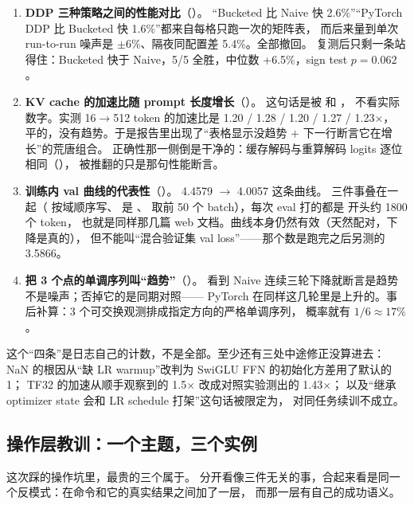 \begin{enumerate}[label=\arabic*.,leftmargin=2em]
\item \textbf{DDP 三种策略之间的性能对比}（）。
      “Bucketed 比 Naive 快 2.6\%”“PyTorch DDP 比 Bucketed 快 1.6\%”都来自每格只跑一次的矩阵表，
      而后来量到单次 run-to-run 噪声是 $\pm$6\%、隔夜同配置差 5.4\%。全部撤回。
      复测后只剩一条站得住：Bucketed 快于 Naive，5/5 全胜，中位数 +6.5\%，sign test $p=0.062$。
\item \textbf{KV cache 的加速比随 prompt 长度增长}（）。
      这句话是被  和  ，
      不看实际数字。实测 16$\to$512 token 的加速比是 1.20 / 1.28 / 1.20 / 1.27 / 1.23$\times$，
      平的，没有趋势。于是报告里出现了“表格显示没趋势 $+$ 下一行断言它在增长”的荒唐组合。
      正确性那一侧倒是干净的：缓存解码与重算解码 logits 逐位相同（），
      被推翻的只是那句性能断言。
\item \textbf{训练内 val 曲线的代表性}（）。
      4.4579 $\to$ 4.0057 这条曲线。
      三件事叠在一起（ 按域顺序写、 是 、
       取前 50 个 batch），每次 eval 打的都是  开头约 1800 个 token，
      也就是同样那几篇 web 文档。曲线本身仍然有效（天然配对，下降是真的），
      但不能叫“混合验证集 val loss”——那个数是跑完之后另测的 3.5866。
\item \textbf{把 3 个点的单调序列叫“趋势”}（）。
      看到 Naive 连续三轮下降就断言是趋势不是噪声；否掉它的是同期对照——
      PyTorch 在同样这几轮里是上升的。事后补算：3 个可交换观测排成指定方向的严格单调序列，
      概率就有 $1/6 \approx 17\%$。
\end{enumerate}

这个“四条”是日志自己的计数，不是全部。至少还有三处中途修正没算进去：
NaN 的根因从“缺 LR warmup”改判为 SwiGLU FFN 的初始化方差用了默认的 1；
TF32 的加速从顺手观察到的 1.5$\times$ 改成对照实验测出的 1.43$\times$；
以及“继承 optimizer state 会和 LR schedule 打架”这句话被限定为，
对同任务续训不成立。

\subsection*{操作层教训：一个主题，三个实例}

这次踩的操作坑里，最贵的三个属于。
分开看像三件无关的事，合起来看是同一个反模式：在命令和它的真实结果之间加了一层，
而那一层有自己的成功语义。

